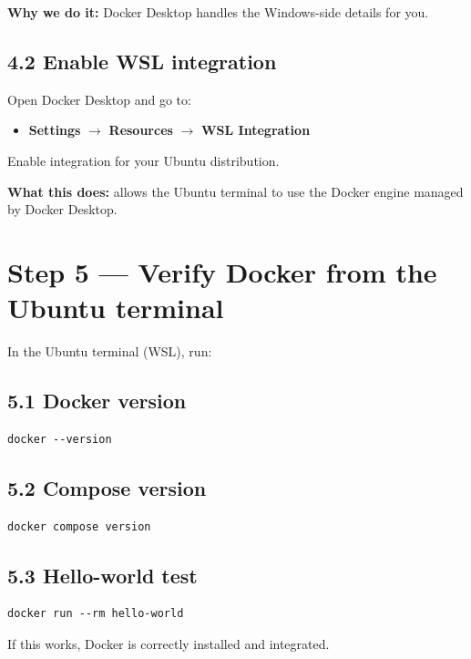 \textbf{Why we do it:} Docker Desktop handles the Windows-side details for you.


\subsection{4.2 Enable WSL integration}
Open Docker Desktop and go to:
\begin{itemize}[leftmargin=*]
  \item \textbf{Settings} $\rightarrow$ \textbf{Resources} $\rightarrow$ \textbf{WSL Integration}
\end{itemize}

Enable integration for your Ubuntu distribution.

\textbf{What this does:} allows the Ubuntu terminal to use the Docker engine managed by Docker Desktop.

\section{Step 5 --- Verify Docker from the Ubuntu terminal}
In the Ubuntu terminal (WSL), run:

\subsection{5.1 Docker version}
\begin{lstlisting}
docker --version
\end{lstlisting}

\subsection{5.2 Compose version}
\begin{lstlisting}
docker compose version
\end{lstlisting}

\subsection{5.3 Hello-world test}
\begin{lstlisting}
docker run --rm hello-world
\end{lstlisting}

If this works, Docker is correctly installed and integrated.

